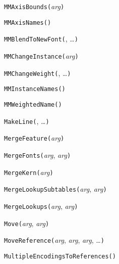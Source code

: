 
\noindent\texttt{MMAxisBounds(}\textit{arg}\texttt{)}


\noindent\texttt{MMAxisNames(}\texttt{)}


\noindent\texttt{MMBlendToNewFont(}, \ldots\texttt{)}


\noindent\texttt{MMChangeInstance(}\textit{arg}\texttt{)}


\noindent\texttt{MMChangeWeight(}, \ldots\texttt{)}


\noindent\texttt{MMInstanceNames(}\texttt{)}


\noindent\texttt{MMWeightedName(}\texttt{)}


\noindent\texttt{MakeLine(}, \ldots\texttt{)}


\noindent\texttt{MergeFeature(}\textit{arg}\texttt{)}


\noindent\texttt{MergeFonts(}\textit{arg}, \textit{arg}\texttt{)}


\noindent\texttt{MergeKern(}\textit{arg}\texttt{)}


\noindent\texttt{MergeLookupSubtables(}\textit{arg}, \textit{arg}\texttt{)}


\noindent\texttt{MergeLookups(}\textit{arg}, \textit{arg}\texttt{)}


\noindent\texttt{Move(}\textit{arg}, \textit{arg}\texttt{)}


\noindent\texttt{MoveReference(}\textit{arg}, \textit{arg}, \textit{arg}, \ldots\texttt{)}


\noindent\texttt{MultipleEncodingsToReferences(}\texttt{)}

